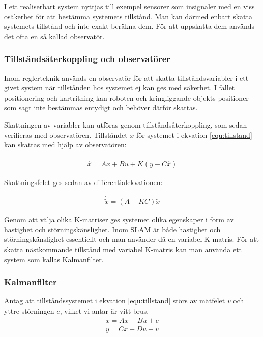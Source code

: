 \documentclass[a4paper,12pt,fleqn]{article}
\begin{document}
I ett realiserbart system nyttjas till exempel sensorer som insignaler med en viss osäkerhet för att bestämma systemets tillstånd. Man kan därmed enbart skatta systemets tillstånd och inte exakt beräkna dem. För att uppskatta dem används det ofta en så kallad observatör.

\subsubsection{Tillståndsåterkoppling och observatörer}

Inom reglerteknik används en observatör för att skatta tillståndsvariabler i ett givet system när tillstånden hos systemet ej kan ges med säkerhet. I fallet positionering och kartritning kan roboten och kringliggande objekts positioner som sagt inte bestämmas entydigt och behöver därför skattas. 

Skattningen av variabler kan utföras genom tillståndsåterkoppling, som sedan verifieras med observatören.  Tillståndet $x$ för systemet i ekvation \ref{equ:tillstand} kan skattas med hjälp av observatören: 

\begin{gather}
\dot{\hat{x}} = Ax + Bu + K(y - C\hat{x})
\label{equ:observer}
\end{gather}

Skattningsfelet ges sedan av differentialekvationen: 

\begin{gather}
\dot{\tilde{x}} = (A - KC)\tilde{x}
\label{equ:observerError}
\end{gather}

Genom att välja olika K-matriser ges systemet olika egenskaper i form av hastighet och störningskänslighet. Inom SLAM är både hastighet och störningskänslighet essentiellt och man använder då en variabel K-matris. För att skatta nästkommande tillstånd med variabel K-matris kan man använda ett system som kallas Kalmanfilter. 

\subsubsection{Kalmanfilter}

Antag att tillståndssystemet i ekvation \ref{equ:tillstand} störs av mätfelet $v$ och yttre störningen $e$, vilket vi antar är vitt brus.  
\begin{gather}
\dot{x}=Ax+Bu+e \\
y=Cx+Du+v
\end{gather}
\end{document}
